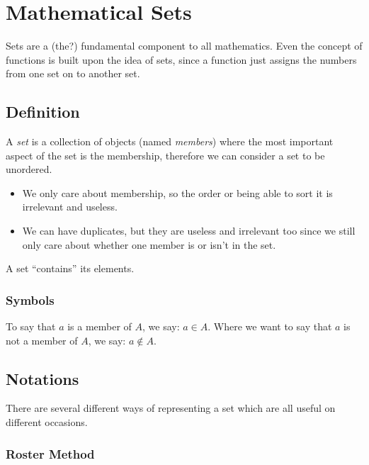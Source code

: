 \section{Mathematical Sets}\label{sec:mathematical_sets}

Sets are a (the?) fundamental component to all mathematics.
Even the concept of functions is built upon the idea of sets, since a function just assigns the numbers from one set on to another set.

\subsection{Definition}\label{sub:definition}

A \emph{set} is a collection of objects (named \emph{members}) where the most important aspect of the set is the membership, therefore we can consider a set to be unordered.
\begin{itemize}
    \item We only care about membership, so the order or being able to sort it is irrelevant and useless.
    \item We can have duplicates, but they are useless and irrelevant too since we still only care about whether one member is or isn't in the set.
\end{itemize}
\begin{note}
    A set ``contains'' its elements.
\end{note}

\subsubsection{Symbols}\label{ssub:symbols}

To say that \(a\) is a member of \(A\), we say: \(a \in A\). Where we want to say that \(a\) is not a member of \(A\), we say: \(a \notin A\).

\subsection{Notations}\label{sub:notations_pafour}

There are several different ways of representing a set which are all useful on different occasions.

\subsubsection{Roster Method}\label{ssub:roster_method}

